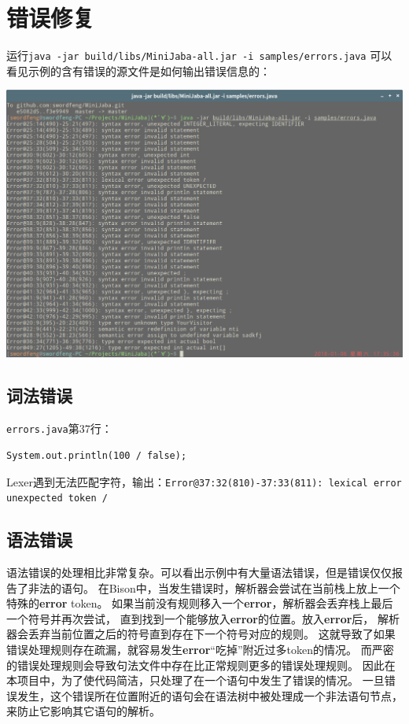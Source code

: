\documentclass[a4paper]{article}
\begin{document}
\section{错误修复}
运行{\tt java -jar build/libs/MiniJaba-all.jar -i samples/errors.java}
可以看见示例的含有错误的源文件是如何输出错误信息的：

\includegraphics[width=\textwidth]{screenshot}

\subsection{词法错误}
{\tt errors.java}第37行：
\begin{lstlisting}[style=minijava]
    System.out.println(100 / false);
\end{lstlisting} \par
Lexer遇到无法匹配字符，输出：{\tt Error@37:32(810)-37:33(811): lexical error unexpected token /}

\subsection{语法错误}
语法错误的处理相比非常复杂。可以看出示例中有大量语法错误，但是错误仅仅报告了非法的语句。
在Bison中，当发生错误时，解析器会尝试在当前栈上放上一个特殊的{\bf error} token。
如果当前没有规则移入一个{\bf error}，解析器会丢弃栈上最后一个符号并再次尝试，
直到找到一个能够放入{\bf error}的位置。放入{\bf error}后，
解析器会丢弃当前位置之后的符号直到存在下一个符号对应的规则。
这就导致了如果错误处理规则存在疏漏，就容易发生{\bf error}“吃掉”附近过多token的情况。
而严密的错误处理规则会导致句法文件中存在比正常规则更多的错误处理规则。
因此在本项目中，为了使代码简洁，只处理了在一个语句中发生了错误的情况。
一旦错误发生，这个错误所在位置附近的语句会在语法树中被处理成一个非法语句节点，来防止它影响其它语句的解析。
\end{document}
